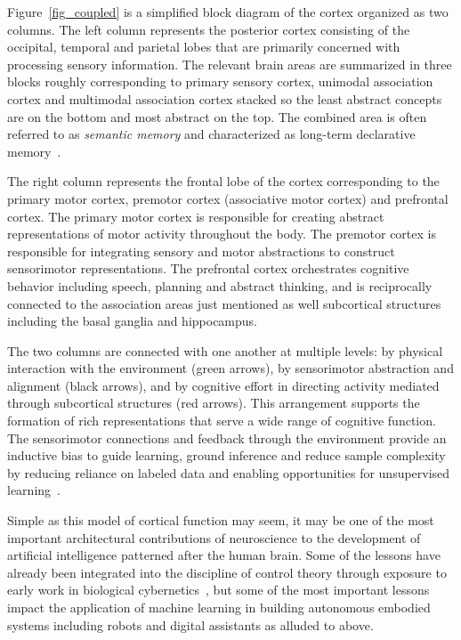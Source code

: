 \documentclass[letterpaper,11pt]{article}
\def\urlh#1{{}}
\begin{document}

Figure~{\urlh{#fig_Coupled_Sensory_Motor_Hierarchy}{\ref{fig_coupled}}} is a simplified block diagram of the cortex organized as two columns. The left column represents the posterior cortex consisting of the occipital, temporal and parietal lobes that are primarily concerned with processing sensory information. The relevant brain areas are summarized in three blocks roughly corresponding to primary sensory cortex, unimodal association cortex and multimodal association cortex stacked so the least abstract concepts are on the bottom and most abstract on the top. The combined area is often referred to as {\it{semantic memory}} and characterized as long-term declarative memory~\cite{BinderandDesaiTiCS-11}. 

The right column represents the frontal lobe of the cortex corresponding to the primary motor cortex, premotor cortex (associative motor cortex) and prefrontal cortex. The primary motor cortex is responsible for creating abstract representations of motor activity throughout the body. The premotor cortex is responsible for integrating sensory and motor abstractions to construct sensorimotor representations. The prefrontal cortex orchestrates cognitive behavior including speech, planning and abstract thinking, and is reciprocally connected to the association areas just mentioned as well subcortical structures including the basal ganglia and hippocampus.

The two columns are connected with one another at multiple levels: by physical interaction with the environment (green arrows), by sensorimotor abstraction and alignment (black arrows), and by cognitive effort in directing activity mediated through subcortical structures (red arrows). This arrangement supports the formation of rich representations that serve a wide range of cognitive function. The sensorimotor connections and feedback through the environment provide an inductive bias to guide learning, ground inference and reduce sample complexity by reducing reliance on labeled data and enabling opportunities for unsupervised learning~\cite{BarlowNC-89}.

Simple as this model of cortical function may seem, it may be one of the most important architectural contributions of neuroscience to the development of artificial intelligence patterned after the human brain. Some of the lessons have already been integrated into the discipline of control theory through exposure to early work in biological cybernetics~\cite{FukushimaBC-80,Lettvinetal59,Jackson1958selected,GibsonPERCEPTION-50,McCullochandPitts43,vonUexk1926theoretical}, but some of the most important lessons impact the application of machine learning in building autonomous embodied systems including robots and digital assistants as alluded to above. 
\end{document}
